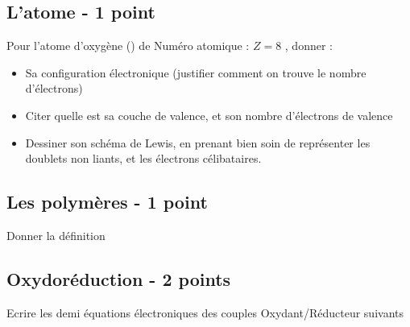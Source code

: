 \documentclass{exam}
\begin{document}
\subsection*{L'atome - 1 point}

\begin{questions}
  \question[1] Pour l'atome d'oxygène () de Numéro atomique : $Z = 8$ , donner : 

  \begin{itemize}[noitemsep]
    \item Sa configuration électronique (justifier comment on trouve le nombre d'électrons)
    \item Citer quelle est sa couche de valence, et son nombre d'électrons de valence 
    \item Dessiner son schéma de Lewis, en prenant bien soin de représenter les doublets non liants, et les électrons célibataires. 
  \end{itemize}
\end{questions}

\subsection*{Les polymères - 1 point}

\begin{questions}
\question[1] Donner la définition
\end{questions}

\subsection*{Oxydoréduction - 2 points}

Ecrire les demi équations électroniques des couples Oxydant/Réducteur suivants
\begin{questions} 
  \question[0.5] 
  \question[0.75] 
  \question[0.75] 
\end{questions}
\end{document}
